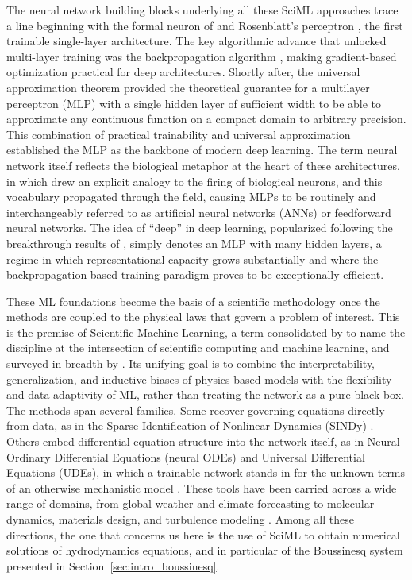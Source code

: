 The neural network building blocks underlying all these SciML approaches trace a line beginning with the formal neuron of \textcite{mcculloch1943} and Rosenblatt's perceptron \parencite{rosenblatt1958}, the first trainable single-layer architecture. The key algorithmic advance that unlocked multi-layer training was the backpropagation algorithm \parencite{rumelhart1986}, making gradient-based optimization practical for deep architectures. Shortly after, the universal approximation theorem \parencite{cybenko1989, hornik1989} provided the theoretical guarantee for a multilayer perceptron (MLP) with a single hidden layer of sufficient width to be able to approximate any continuous function on a compact domain to arbitrary precision. This combination of practical trainability and universal approximation established the MLP as the backbone of modern deep learning. The term neural network itself reflects the biological metaphor at the heart of these architectures, in which \textcite{mcculloch1943} drew an explicit analogy to the firing of biological neurons, and this vocabulary propagated through the field, causing MLPs to be routinely and interchangeably referred to as artificial neural networks (ANNs) or feedforward neural networks. The idea of ``deep'' in deep learning, popularized following the breakthrough results of \textcite{lecun2015deep}, simply denotes an MLP with many hidden layers, a regime in which representational capacity grows substantially and where the backpropagation-based training paradigm proves to be exceptionally efficient.

These ML foundations become the basis of a scientific methodology once the methods are coupled to the physical laws that govern a problem of interest. This is the premise of Scientific Machine Learning, a term consolidated by \textcite{baker2019} to name the discipline at the intersection of scientific computing and machine learning, and surveyed in breadth by \textcite{karniadakis2021}. Its unifying goal is to combine the interpretability, generalization, and inductive biases of physics-based models with the flexibility and data-adaptivity of ML, rather than treating the network as a pure black box. The methods span several families. Some recover governing equations directly from data, as in the Sparse Identification of Nonlinear Dynamics (SINDy) \parencite{brunton2016}. Others embed differential-equation structure into the network itself, as in Neural Ordinary Differential Equations (neural ODEs) \parencite{chen2018node} and Universal Differential Equations (UDEs), in which a trainable network stands in for the unknown terms of an otherwise mechanistic model \parencite{rackauckas2020}. These tools have been carried across a wide range of domains, from global weather and climate forecasting \parencite{bonev2023} to molecular dynamics, materials design, and turbulence modeling \parencite{karniadakis2021}. Among all these directions, the one that concerns us here is the use of SciML to obtain numerical solutions of hydrodynamics equations, and in particular of the Boussinesq system presented in Section~\ref{sec:intro_boussinesq}.

